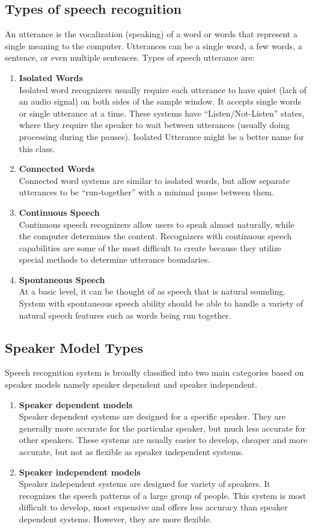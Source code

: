 \documentclass[12pt, a4paper, twoside]{report}
\begin{document}
\subsection{Types of speech recognition}
An utterance is the vocalization (speaking) of a word or words that represent a single meaning to the computer. Utterances can be a single word, a few words, a sentence, or even multiple sentences. Types of speech utterance are:
\begin{enumerate}[label=\textbf{\Roman*.}]
\item \textbf{Isolated Words}\\
Isolated word recognizers usually require each utterance to have quiet (lack of an audio signal) on both sides of the sample window. It accepts single words or single utterance at a time. These systems have ``Listen/Not-Listen'' states, where they require the speaker to wait between utterances (usually doing processing during the pauses). Isolated Utterance might be a better name for this class.
\item \textbf{Connected Words}\\
Connected word systems are similar to isolated words, but allow separate utterances to be ``run-together'' with a minimal pause between them.
\item \textbf{Continuous Speech}\\
Continuous speech recognizers allow users to speak almost naturally, while the computer determines the content. Recognizers with continuous speech capabilities are some of the most difficult to create because they utilize special methods to determine utterance boundaries. 
\item \textbf{Spontaneous Speech}\\
At a basic level, it can be thought of as speech that is natural sounding. System with spontaneous speech ability should be able to handle a variety of natural speech features such as words being run together.
\end{enumerate}

\subsection{Speaker Model Types}
Speech recognition system is broadly classified into two main categories based on speaker models namely speaker dependent and speaker independent.
\begin{enumerate}[label=\textbf{\Roman*.}]
\item \textbf{Speaker dependent models}\\
Speaker dependent systems are designed for a specific speaker. They are generally more accurate for the particular speaker, but much less accurate for other speakers. These systems are usually easier to develop, cheaper and more accurate, but not as flexible as speaker independent systems. 
\item \textbf{Speaker independent models}\\
Speaker independent systems are designed for variety of speakers. It recognizes the speech patterns of a large group of people. This system is most difficult to develop, most expensive and offers less accuracy than speaker dependent systems. However, they are more flexible.
\end{enumerate}
\end{document}
